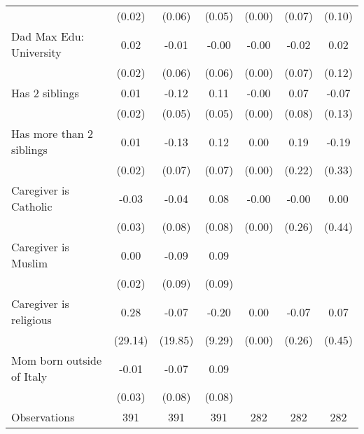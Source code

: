 {\begin{tabular}{l*{6}{c}}
                    &      (0.02)         &      (0.06)         &      (0.05)         &      (0.00)         &      (0.07)         &      (0.10)         \\
\addlinespace
Dad Max Edu: University&        0.02         &       -0.01         &       -0.00         &       -0.00         &       -0.02         &        0.02         \\
                    &      (0.02)         &      (0.06)         &      (0.06)         &      (0.00)         &      (0.07)         &      (0.12)         \\
\addlinespace
Has 2 siblings      &        0.01         &       -0.12\sym{*}  &        0.11\sym{*}  &       -0.00         &        0.07         &       -0.07         \\
                    &      (0.02)         &      (0.05)         &      (0.05)         &      (0.00)         &      (0.08)         &      (0.13)         \\
\addlinespace
Has more than 2 siblings&        0.01         &       -0.13         &        0.12         &        0.00         &        0.19         &       -0.19         \\
                    &      (0.02)         &      (0.07)         &      (0.07)         &      (0.00)         &      (0.22)         &      (0.33)         \\
\addlinespace
Caregiver is Catholic&       -0.03         &       -0.04         &        0.08         &       -0.00         &       -0.00         &        0.00         \\
                    &      (0.03)         &      (0.08)         &      (0.08)         &      (0.00)         &      (0.26)         &      (0.44)         \\
\addlinespace
Caregiver is Muslim &        0.00         &       -0.09         &        0.09         &                &                 &                 \\
                    &      (0.02)         &      (0.09)         &      (0.09)         &                 &                &               \\
\addlinespace
Caregiver is religious&        0.28         &       -0.07         &       -0.20         &        0.00         &       -0.07         &        0.07         \\
                    &     (29.14)         &     (19.85)         &      (9.29)         &      (0.00)         &      (0.26)         &      (0.45)         \\
\addlinespace
Mom born outside of Italy&       -0.01         &       -0.07         &        0.09         &                 &                 &                 \\
                    &      (0.03)         &      (0.08)         &      (0.08)         &                &                  &                  \\
\midrule
Observations        &         391         &         391         &         391         &         282         &         282         &         282         \\
\bottomrule
\end{tabular}
}

